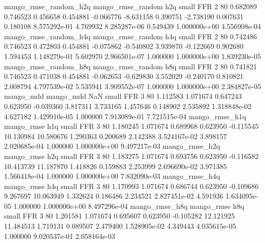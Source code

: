 mango_rmse_random_h2q mango_rmse_random                  h2q      small      FFR                 2 80 0.682089       0.746523 0.456658       0.454881   -0.066776     -8.631158      0.390751    -2.738190       0.007631  0.180108 8.575292e-01     4.769932   8.285287e-06            0.549439    1.000000e+00        4.556908e-04
mango_rmse_random_h4q mango_rmse_random                  h4q      small      FFR                 2 80 0.742486       0.746523 0.472803       0.454881   -0.075862     -0.540802      3.939870    -0.122669       0.902680  1.594453 1.148279e-01     5.602970   2.966501e-07            1.000000    1.000000e+00        1.839230e-05
mango_rmse_random_h8q mango_rmse_random                  h8q      small      FFR                 2 80 0.741821       0.746523 0.471038       0.454881   -0.062653     -0.629830      3.552029    -0.240170       0.810821  2.008794 4.797539e-02     5.535941   3.909552e-07            1.000000    1.000000e+00        2.384827e-05
            mango_mdd         mango_mdd                  NaN      small      FFR                 3 80 1.112583       1.071674 0.647243       0.623950   -0.039360      3.817311      3.733165     1.457646       0.148902  2.535892 1.318848e-02     4.627182   1.429910e-05            1.000000    7.913089e-01        7.721515e-04
       mango_rmse_h1q        mango_rmse                  h1q      small      FFR                 3 80 1.180245       1.071674 0.689968       0.623950   -0.115545     10.130984     10.580676     1.290363       0.200689  2.142388 3.524167e-02     3.898157   2.020685e-04            1.000000    1.000000e+00        9.497217e-03
       mango_rmse_h2q        mango_rmse                  h2q      small      FFR                 3 80 1.183275       1.071674 0.693756       0.623950   -0.116582     10.413739     11.187870     1.418826       0.159883  2.253999 2.696690e-02     3.971385   1.566418e-04            1.000000    1.000000e+00        7.832090e-03
       mango_rmse_h4q        mango_rmse                  h4q      small      FFR                 3 80 1.170993       1.071674 0.686744       0.623950   -0.109686      9.267697     10.063949     1.332624       0.186486  2.234521 2.827451e-02     4.591936   1.634095e-05            1.000000    1.000000e+00        8.497296e-04
       mango_rmse_h8q        mango_rmse                  h8q      small      FFR                 3 80 1.201581       1.071674 0.695607       0.623950   -0.105282     12.121925     11.484513     1.719131       0.089507  2.479400 1.528905e-02     4.349443   4.035615e-05            1.000000    9.020537e-01        2.058164e-03
